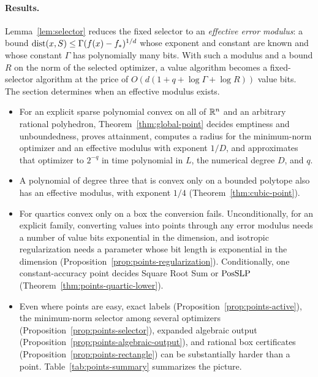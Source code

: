 \paragraph{Results.}
Lemma~\ref{lem:selector} reduces the fixed selector to an \emph{effective
error modulus}: a bound $\operatorname{dist}(x,S)\le\Gamma(f(x)-f_*)^{1/d}$ whose exponent
and constant are known and whose constant $\Gamma$ has polynomially many
bits. With such a modulus and a bound $R$ on the norm of the selected
optimizer, a value algorithm becomes a fixed-selector algorithm at the price
of $O(d(1+q+\log\Gamma+\log R))$ value bits. The section determines when an
effective modulus exists.
\begin{itemize}
\item For an explicit sparse polynomial convex on all of $\mathbb R^n$ and an
arbitrary rational polyhedron, Theorem~\ref{thm:global-point} decides
emptiness and unboundedness, proves attainment, computes a radius for the
minimum-norm optimizer and an effective modulus with exponent $1/D$, and
approximates that optimizer to $2^{-q}$ in time polynomial in $L$, the
numerical degree $D$, and $q$.
\item A polynomial of degree three that is convex only on a bounded polytope
also has an effective modulus, with exponent $1/4$
(Theorem~\ref{thm:cubic-point}).
\item For quartics convex only on a box the conversion fails.
Unconditionally, for an explicit family, converting values into points
through any error modulus needs a number of value bits exponential in the
dimension, and isotropic regularization needs a parameter whose bit length is
exponential in the dimension (Proposition~\ref{prop:points-regularization}).
Conditionally, one constant-accuracy point decides Square Root Sum or
$\mathrm{PosSLP}$ (Theorem~\ref{thm:points-quartic-lower}).
\item Even where points are easy, exact labels
(Proposition~\ref{prop:points-active}), the minimum-norm selector among
several optimizers (Proposition~\ref{prop:points-selector}), expanded
algebraic output (Proposition~\ref{prop:points-algebraic-output}), and
rational box certificates (Proposition~\ref{prop:points-rectangle}) can be
substantially harder than a point. Table~\ref{tab:points-summary} summarizes
the picture.
\end{itemize}

